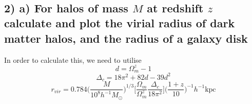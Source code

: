 \documentclass[11pt]{article}
\begin{document}
    \begin{center}
    \end{center}
    { \hspace*{\fill} \\}
    
    \subsection{\texorpdfstring{2) a) For halos of mass \(M\) at redshift
\(z\) calculate and plot the virial radius of dark matter halos, and the
radius of a galaxy
disk}{2) a) For halos of mass M at redshift z calculate and plot the virial radius of dark matter halos, and the radius of a galaxy disk}}\label{a-for-halos-of-mass-m-at-redshift-z-calculate-and-plot-the-virial-radius-of-dark-matter-halos-and-the-radius-of-a-galaxy-disk}

In order to calculate this, we need to utilise \[d = \Omega_m^z - 1 \]
\[\Delta_c = 18\pi^2 + 82 d - 39d^2 \]
\[ r_{vir} = 0.784 \Big( \frac{M}{10^{8} h^{-1} M_{\odot}} \Big)^{1/3} \Big[ \frac{\Omega_m}{\Omega_m^z} \frac{\Delta_c}{18\pi^2} \Big] \Big( \frac{1+z}{10} \Big)^{-1} h^{-1} \text{kpc} \]
\end{document}
